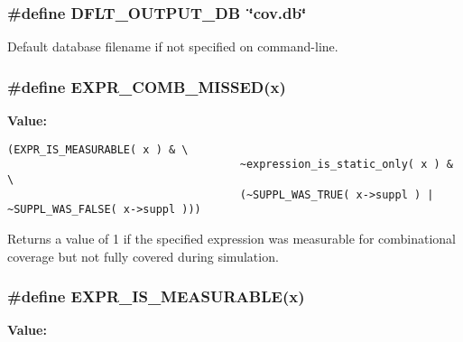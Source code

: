 \subsubsection{\setlength{\rightskip}{0pt plus 5cm}\#define DFLT\_\-OUTPUT\_\-DB\ \char`\"{}cov.db\char`\"{}}\label{defines_8h_a2}


Default database filename if not specified on command-line. 
\subsubsection{\setlength{\rightskip}{0pt plus 5cm}\#define EXPR\_\-COMB\_\-MISSED(x)}\label{defines_8h_a132}


{\bf Value:}

\footnotesize\begin{verbatim}(EXPR_IS_MEASURABLE( x ) & \
                                    ~expression_is_static_only( x ) & \
                                    (~SUPPL_WAS_TRUE( x->suppl ) | ~SUPPL_WAS_FALSE( x->suppl )))
\end{verbatim}\normalsize 
Returns a value of 1 if the specified expression was measurable for combinational coverage but not fully covered during simulation. 
\subsubsection{\setlength{\rightskip}{0pt plus 5cm}\#define EXPR\_\-IS\_\-MEASURABLE(x)}\label{defines_8h_a130}


{\bf Value:}

